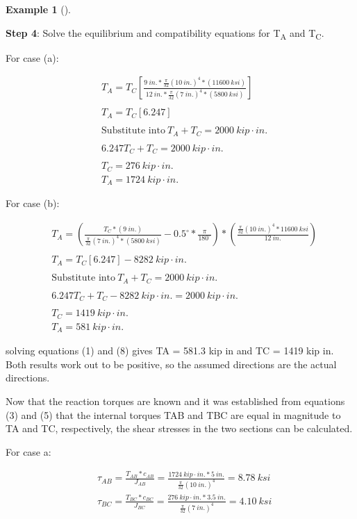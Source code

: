 \documentclass[
  letterpaper,
  DIV=11,
  numbers=noendperiod]{scrreprt}
\theoremstyle{definition}
\newtheorem{example}{Example}[chapter]
\theoremstyle{remark}
\begin{document}
\begin{tcolorbox}
\begin{example}[]
\begin{tcolorbox}
\textbf{Step 4}: Solve the equilibrium and compatibility equations for
T\textsubscript{A} and T\textsubscript{C}.

For case (a):

\[
\begin{aligned}
&T_A=T_C\left[\frac{9{~in.}*\frac{\pi}{32}(10{~in.})^4*(11600{~ksi})}{12{~in.}*\frac{\pi}{32}(7{~in.})^4*(5800{~ksi})}\right] \\
\\
&T_A=T_C[6.247] \\
\\
&\text{Substitute into}~T_A+T_C=2000{~kip}\cdot{in.} \\
\\
&6.247T_C+T_C=2000{~kip}\cdot{in.} \\
\\
&T_C=276{~kip}\cdot{in.} \\
&T_A=1724{~kip}\cdot{in.}
\end{aligned}
\]

For case (b):

\[
\begin{aligned}
&T_A=\left(\frac{T_C*(9{~in.})}{\frac{\pi}{32}(7{~in.})^4*(5800{~ksi})}-0.5^\circ*\frac{\pi}{180^\circ}\right)*\left(\frac{\frac{\pi}{32}(10{~in.})^4*11600{~ksi}}{12~in.}\right) \\
\\
&T_A=T_C[6.247]-8282{~kip}\cdot{in.} \\
\\
&\text{Substitute into}~T_A+T_C=2000{~kip}\cdot{in.} \\
\\
&6.247T_C+T_C-8282{~kip}\cdot{in.}=2000{~kip}\cdot{in.} \\
\\
&T_C=1419{~kip}\cdot{in.} \\
&T_A=581{~kip}\cdot{in.}
\end{aligned}
\]

solving equations (1) and (8) gives TA = 581.3 kip in and TC = 1419 kip
in. Both results work out to be positive, so the assumed directions are
the actual directions.

Now that the reaction torques are known and it was established from
equations (3) and (5) that the internal torques TAB and TBC are equal in
magnitude to TA and TC, respectively, the shear stresses in the two
sections can be calculated.

For case a:

\[
\begin{aligned}
& \tau_{AB}=\frac{T_{AB}*c_{AB}}{J_{AB}}=\frac{1724{~kip}\cdot{in.}*5{~in.}}{\frac{\pi}{32}(10{~in.})^4}=8.78{~ksi} \\
& \tau_{BC}=\frac{T_{BC}*c_{BC}}{J_{BC}}=\frac{276{~kip}\cdot{in.}*3.5{~in.}}{\frac{\pi}{32}(7{~in.})^4}=4.10{~ksi}
\end{aligned}
\]


\end{tcolorbox}
\end{example}
\end{tcolorbox}
\end{document}
